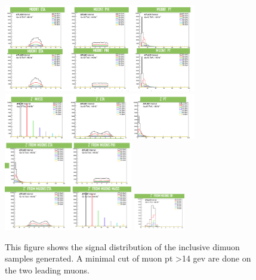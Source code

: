 \begin{figure}[!htb]
    \begin{center}
        \includegraphics[width=0.75\textwidth]{figures/chapter_dimuon/dimuondist1}
        \includegraphics[width=0.75\textwidth]{figures/chapter_dimuon/dimuondist2}
        \includegraphics[width=0.5\textwidth]{figures/chapter_dimuon/dimuondist3}
        \includegraphics[width=0.2\textwidth]{figures/chapter_dimuon/dimuondist4}
        \caption{
        This figure shows the signal distribution of the inclusive dimuon samples generated. A minimal cut of muon pt >14 gev are done on the two leading muons. }
        \label{fig:dimuon}
    \end{center}
\end{figure}


